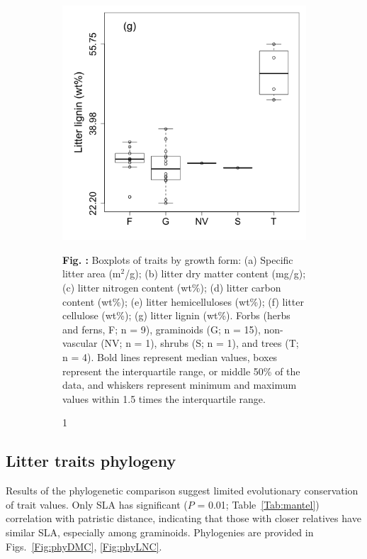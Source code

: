 \documentclass{article}
\newcommand{\fillcaption}[1]{ %
\textbf{Fig. \arabic{figure}:} #1 %
\addtocounter {figure} {1} %
}
\begin{document}
\begin{figure}
\begin{subfigure}[!ht]{0.3\textwidth}
	\end{subfigure}
	\smallskip
	\begin{subfigure}[!ht]{0.3\textwidth}
		\includegraphics[width=\textwidth]{figs/LG_boxplot.png}
	\end{subfigure}
	\begin{subfigure}[!ht]{0.6\textwidth}
		\vspace{10 pt}
		\fillcaption{Boxplots of traits by growth form: (a) Specific litter area (m$^2$/g); (b) litter dry matter content (mg/g); (c) litter nitrogen content (wt\%); (d) litter carbon content (wt\%); (e) litter hemicelluloses (wt\%); (f) litter cellulose (wt\%); (g) litter lignin (wt\%). Forbs (herbs and ferns, F; n = 9), graminoids (G; n = 15), non-vascular (NV; n = 1), shrubs (S; n = 1), and trees (T; n = 4). Bold lines represent median values, boxes represent the interquartile range, or middle 50\% of the data, and whiskers represent minimum and maximum values within 1.5 times the interquartile range.}
		\end{subfigure}
\end{figure}

\subsection{Litter traits phylogeny}
Results of the phylogenetic comparison suggest limited evolutionary conservation of trait values. Only SLA has significant ($P$ = 0.01; Table~\ref{Tab:mantel}) correlation with patristic distance, indicating that those with closer relatives have similar SLA, especially among graminoids. Phylogenies are provided in Figs.~\ref{Fig:phyDMC}, \ref{Fig:phyLNC}. 
\end{document}
